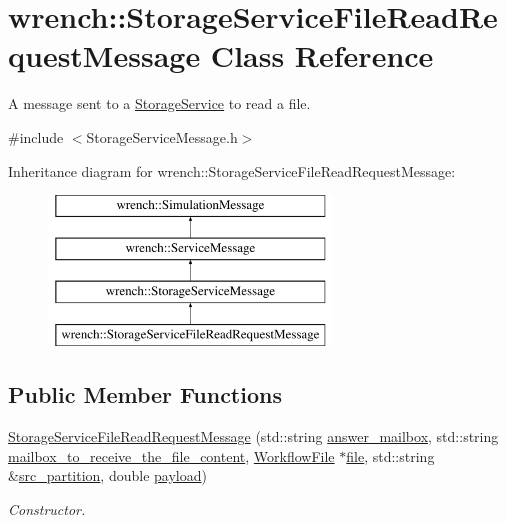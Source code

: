 \hypertarget{classwrench_1_1_storage_service_file_read_request_message}{}\section{wrench\+:\+:Storage\+Service\+File\+Read\+Request\+Message Class Reference}
\label{classwrench_1_1_storage_service_file_read_request_message}


A message sent to a \hyperlink{classwrench_1_1_storage_service}{Storage\+Service} to read a file.  




{\ttfamily \#include $<$Storage\+Service\+Message.\+h$>$}

Inheritance diagram for wrench\+:\+:Storage\+Service\+File\+Read\+Request\+Message\+:\begin{figure}[H]
\begin{center}
\leavevmode
\includegraphics[height=4.000000cm]{classwrench_1_1_storage_service_file_read_request_message}
\end{center}
\end{figure}
\subsection*{Public Member Functions}
\begin{DoxyCompactItemize}
\item 
\hyperlink{classwrench_1_1_storage_service_file_read_request_message_a756aa9a511928887dc01029f2f235996}{Storage\+Service\+File\+Read\+Request\+Message} (std\+::string \hyperlink{classwrench_1_1_storage_service_file_read_request_message_ae3b18f7ca721898c731a9cff09a67f3e}{answer\+\_\+mailbox}, std\+::string \hyperlink{classwrench_1_1_storage_service_file_read_request_message_a3cc7323e6c5d74ec2408d60cbb9d8de4}{mailbox\+\_\+to\+\_\+receive\+\_\+the\+\_\+file\+\_\+content}, \hyperlink{classwrench_1_1_workflow_file}{Workflow\+File} $\ast$\hyperlink{classwrench_1_1_storage_service_file_read_request_message_a4a54efd6596532b21d135f59bfad7eb8}{file}, std\+::string \&\hyperlink{classwrench_1_1_storage_service_file_read_request_message_a22bfdc4532b66469b60c77aa7ec65459}{src\+\_\+partition}, double \hyperlink{classwrench_1_1_simulation_message_a914f2732713f7c02898e66f05a7cb8a1}{payload})
\begin{DoxyCompactList}\small\item\em Constructor. \end{DoxyCompactList}\end{DoxyCompactItemize}

